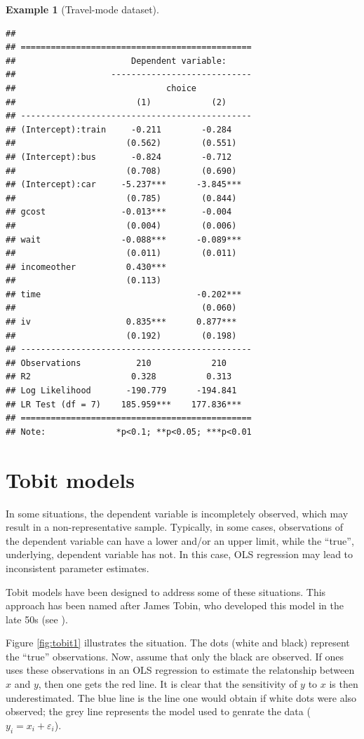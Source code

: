 \documentclass[
  12pt,
]{book}
\theoremstyle{definition}
\theoremstyle{definition}
\newtheorem{example}{Example}[chapter]
\theoremstyle{definition}
\theoremstyle{definition}
\theoremstyle{remark}
\begin{document}
\begin{example}[Travel-mode dataset]
\begin{verbatim}
## 
## ==============================================
##                       Dependent variable:     
##                   ----------------------------
##                              choice           
##                        (1)            (2)     
## ----------------------------------------------
## (Intercept):train     -0.211        -0.284    
##                      (0.562)        (0.551)   
## (Intercept):bus       -0.824        -0.712    
##                      (0.708)        (0.690)   
## (Intercept):car     -5.237***      -3.845***  
##                      (0.785)        (0.844)   
## gcost               -0.013***       -0.004    
##                      (0.004)        (0.006)   
## wait                -0.088***      -0.089***  
##                      (0.011)        (0.011)   
## incomeother          0.430***                 
##                      (0.113)                  
## time                               -0.202***  
##                                     (0.060)   
## iv                   0.835***      0.877***   
##                      (0.192)        (0.198)   
## ----------------------------------------------
## Observations           210            210     
## R2                    0.328          0.313    
## Log Likelihood       -190.779      -194.841   
## LR Test (df = 7)    185.959***    177.836***  
## ==============================================
## Note:              *p<0.1; **p<0.05; ***p<0.01
\end{verbatim}

\end{example}

\hypertarget{tobit}{%
\section{Tobit models}\label{tobit}}

In some situations, the dependent variable is incompletely observed, which may result in a non-representative sample. Typically, in some cases, observations of the dependent variable can have a lower and/or an upper limit, while the ``true'', underlying, dependent variable has not. In this case, OLS regression may lead to inconsistent parameter estimates.

Tobit models have been designed to address some of these situations. This approach has been named after James Tobin, who developed this model in the late 50s (see \citet{Tobin_1956}).

Figure \ref{fig:tobit1} illustrates the situation. The dots (white and black) represent the ``true'' observations. Now, assume that only the black are observed. If ones uses these observations in an OLS regression to estimate the relatonship between \(x\) and \(y\), then one gets the red line. It is clear that the sensitivity of \(y\) to \(x\) is then underestimated. The blue line is the line one would obtain if white dots were also observed; the grey line represents the model used to genrate the data (\(y_i=x_i+\varepsilon_i\)).
\end{document}
